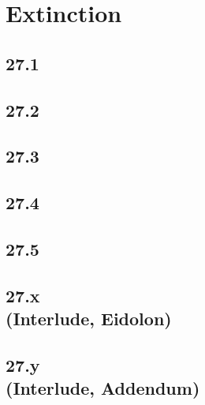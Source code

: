 \part{Extinction}

 \chapter{27.1}

 \chapter{27.2}

 \chapter{27.3}

 \chapter{27.4}

 \chapter{27.5}

 \chapter[27.x (Interlude, Eidolon)]{27.x\\(Interlude, Eidolon)}

 \chapter[27.y (Interlude, Addendum)]{27.y\\(Interlude, Addendum)}








